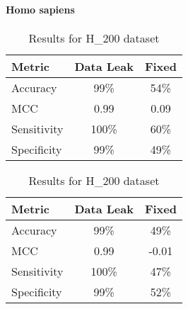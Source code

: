       \paragraph{Homo sapiens}
        \noindent
        \begin{table}[H]
            \centering
            \begin{minipage}{0.45\textwidth}
              \centering
              \begin{tabular}{lcc}
                \toprule
                \textbf{Metric} & \textbf{Data Leak} & \textbf{Fixed} \\
                \midrule
                Accuracy        & 99\%               & 54\%           \\
                MCC             & 0.99               & 0.09           \\
                Sensitivity     & 100\%              & 60\%           \\
                Specificity     & 99\%               & 49\%           \\
                \bottomrule
              \end{tabular}
              \caption{Results for H\_990 dataset}
            \end{minipage}%
            \hfill
            \begin{minipage}{0.45\textwidth}
              \centering
              \begin{tabular}{lcc}
                \toprule
                \textbf{Metric} & \textbf{Data Leak} & \textbf{Fixed} \\
                \midrule
                Accuracy        & 99\%               & 49\%           \\
                MCC             & 0.99               & -0.01          \\
                Sensitivity     & 100\%              & 47\%           \\
                Specificity     & 99\%               & 52\%           \\
                \bottomrule
              \end{tabular}
              \caption{Results for H\_200 dataset}
            \end{minipage}\label{tab:xgb_pstnpss_hs}
        \end{table}

